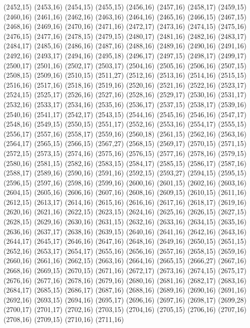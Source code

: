 (2452,15)
(2453,16)
(2454,15)
(2455,15)
(2456,16)
(2457,16)
(2458,17)
(2459,15)
(2460,16)
(2461,16)
(2462,16)
(2463,16)
(2464,16)
(2465,16)
(2466,15)
(2467,15)
(2468,16)
(2469,16)
(2470,16)
(2471,16)
(2472,17)
(2473,16)
(2474,15)
(2475,16)
(2476,15)
(2477,16)
(2478,15)
(2479,15)
(2480,17)
(2481,16)
(2482,16)
(2483,17)
(2484,17)
(2485,16)
(2486,16)
(2487,16)
(2488,16)
(2489,16)
(2490,16)
(2491,16)
(2492,16)
(2493,17)
(2494,16)
(2495,18)
(2496,17)
(2497,15)
(2498,17)
(2499,17)
(2500,17)
(2501,16)
(2502,17)
(2503,17)
(2504,16)
(2505,16)
(2506,16)
(2507,15)
(2508,15)
(2509,16)
(2510,15)
(2511,27)
(2512,16)
(2513,16)
(2514,16)
(2515,15)
(2516,16)
(2517,16)
(2518,16)
(2519,16)
(2520,16)
(2521,16)
(2522,16)
(2523,17)
(2524,15)
(2525,17)
(2526,16)
(2527,16)
(2528,16)
(2529,17)
(2530,16)
(2531,17)
(2532,16)
(2533,17)
(2534,16)
(2535,16)
(2536,17)
(2537,15)
(2538,17)
(2539,16)
(2540,16)
(2541,17)
(2542,17)
(2543,15)
(2544,16)
(2545,16)
(2546,16)
(2547,17)
(2548,16)
(2549,15)
(2550,15)
(2551,17)
(2552,16)
(2553,16)
(2554,17)
(2555,15)
(2556,17)
(2557,16)
(2558,17)
(2559,16)
(2560,18)
(2561,15)
(2562,16)
(2563,16)
(2564,17)
(2565,15)
(2566,15)
(2567,27)
(2568,15)
(2569,17)
(2570,15)
(2571,15)
(2572,15)
(2573,15)
(2574,16)
(2575,16)
(2576,15)
(2577,16)
(2578,16)
(2579,15)
(2580,16)
(2581,15)
(2582,16)
(2583,15)
(2584,17)
(2585,15)
(2586,17)
(2587,16)
(2588,17)
(2589,16)
(2590,16)
(2591,16)
(2592,15)
(2593,27)
(2594,15)
(2595,15)
(2596,15)
(2597,16)
(2598,16)
(2599,16)
(2600,16)
(2601,15)
(2602,16)
(2603,16)
(2604,15)
(2605,16)
(2606,16)
(2607,16)
(2608,16)
(2609,15)
(2610,15)
(2611,16)
(2612,15)
(2613,17)
(2614,16)
(2615,16)
(2616,16)
(2617,16)
(2618,17)
(2619,16)
(2620,16)
(2621,16)
(2622,15)
(2623,15)
(2624,16)
(2625,16)
(2626,15)
(2627,15)
(2628,15)
(2629,16)
(2630,16)
(2631,15)
(2632,16)
(2633,16)
(2634,15)
(2635,16)
(2636,16)
(2637,17)
(2638,16)
(2639,15)
(2640,16)
(2641,16)
(2642,16)
(2643,16)
(2644,17)
(2645,17)
(2646,16)
(2647,16)
(2648,16)
(2649,16)
(2650,15)
(2651,15)
(2652,16)
(2653,17)
(2654,17)
(2655,16)
(2656,16)
(2657,16)
(2658,15)
(2659,16)
(2660,16)
(2661,16)
(2662,15)
(2663,16)
(2664,16)
(2665,15)
(2666,27)
(2667,16)
(2668,16)
(2669,15)
(2670,15)
(2671,16)
(2672,17)
(2673,16)
(2674,15)
(2675,17)
(2676,16)
(2677,16)
(2678,16)
(2679,16)
(2680,16)
(2681,16)
(2682,17)
(2683,16)
(2684,17)
(2685,15)
(2686,17)
(2687,16)
(2688,16)
(2689,16)
(2690,16)
(2691,16)
(2692,16)
(2693,15)
(2694,16)
(2695,17)
(2696,16)
(2697,16)
(2698,17)
(2699,28)
(2700,17)
(2701,17)
(2702,16)
(2703,15)
(2704,16)
(2705,15)
(2706,16)
(2707,16)
(2708,16)
(2709,15)
(2710,16)
(2711,16)
